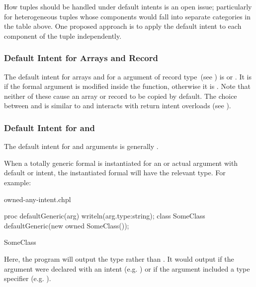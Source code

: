 \begin{openissue}
How tuples should be handled under default intents is an open issue;
particularly for heterogeneous tuples whose components would fall into
separate categories in the table above.  One proposed approach is to
apply the default intent to each component of the tuple independently.
\end{openissue}

\subsubsection{Default Intent for Arrays and Record }
\label{Default_Intent_for_Arrays_and_Record_this}

The default intent for arrays and for a  argument of record
type~(see ) is  or . It is  if the formal argument is modified inside the
function, otherwise it is .  Note that neither of these
cause an array or record to be copied by default.  The choice between
 and  is similar to and interacts with return
intent overloads (see ).

\subsubsection{Default Intent for  and }
\label{Default_Intent_for_owned_and_shared}

The default intent for  and  arguments is
generally .

When a totally generic formal is instantiated for an  or
 actual argument with default or  intent, the
instantiated formal will have the relevant  type. For
example:

\begin{chapelexample}{owned-any-intent.chpl}
\begin{chapel}
proc defaultGeneric(arg) {
  writeln(arg.type:string);
}
class SomeClass { }
defaultGeneric(new owned SomeClass());
\end{chapel}
\begin{chapeloutput}
SomeClass
\end{chapeloutput}
Here, the program will output the type  rather
than . It would output  if
the argument were declared with an  intent (e.g. ) or if
the argument included a type specifier (e.g. ).
\end{chapelexample}

